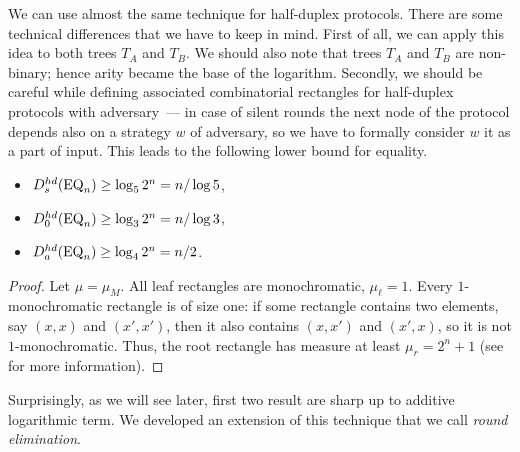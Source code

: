 We can use almost the same technique for half-duplex protocols. 
There are some technical differences that we have to keep in mind. 
First of all, we can apply this idea to both trees $T_A$ and $T_B$. 
We should also note that trees $T_A$ and $T_B$ are non-binary; hence
arity became the base of the logarithm. 
Secondly, we should be careful while defining associated 
combinatorial rectangles for half-duplex protocols with adversary~--- 
in case of silent rounds the next node of the protocol depends also 
on a strategy $w$ of adversary, so we have to formally
consider $w$ it as a part of input. This leads to the following lower 
bound for equality.
\begin{theorem}\label{thm:private-arity-bounds-eq}
\mbox{}
\begin{itemize}
\item $D^{hd}_s(\mathrm{EQ}_n) \ge \log_5{2^n} = n/\log 5$,

\item $D^{hd}_0(\mathrm{EQ}_n) \ge \log_3{2^n} = n/\log 3$,

\item $D^{hd}_a(\mathrm{EQ}_n) \ge \log_{4}{2^n} = n/2$.
\end{itemize}
\end{theorem}
\begin{proof}
Let $\mu = \mu_M$. All leaf rectangles are monochromatic, $\mu_\ell = 1$. Every $1$-monochromatic rectangle is of size one: if some rectangle contains two elements, say $(x,x)$ and $(x',x')$, then it also contains $(x,x')$ and $(x',x)$, so it is not $1$-monochromatic. Thus, the root rectangle has measure at least $\mu_r = 2^n + 1$ (see \cite{KN97} for more information). 
\end{proof}
Surprisingly, as we will see later, first two result are sharp up to additive logarithmic term.
We developed an extension of this technique that we call \emph{round elimination}.

